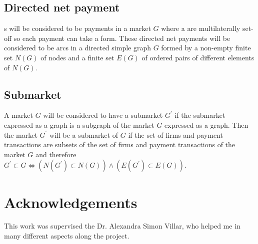 \documentclass[12pt]{article}
\begin{document}
\begin{multicols}{2}
\subsection{Directed net payment} \label{dnp}
s will be considered to be payments in a market $G$ where a  are multilaterally set-off so each payment can take a  form. These directed net payments will be considered to be arcs in a directed simple graph $G$ formed by a non-empty finite set $N(G)$ of nodes and a finite set $E(G)$ of ordered pairs of different elements of $N(G)$.

\subsection{Submarket}
A market $G$ will be considered to have a submarket $G^{\prime}$ if the submarket expressed as a graph is a subgraph of the market $G$ expressed as a graph. Then the market $G^{\prime}$ will be a submarket of $G$ if the set of firms and payment transactions are subsets of the set of firms and payment transactions of the market $G$ and therefore $G^{\prime} \subset G \iff (N(G^{\prime}) \subset N(G)) \land(E(G^{\prime}) \subset E(G))$.


\cite{wilson1979introduction}
\cite{lisbonne2020blockchainmath}
\section{Acknowledgements}
This work was supervised the Dr. Alexandra Simon Villar, who helped me in many different aspects along the project.
\printbibliography %
\end{multicols}
\end{document}
